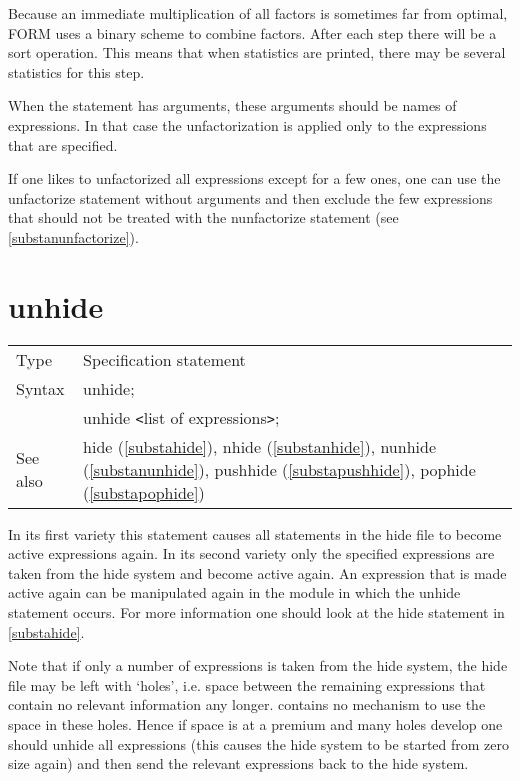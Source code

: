 \noindent Because an immediate multiplication of all factors is sometimes 
far from optimal, FORM uses a binary scheme to combine factors. After each 
step there will be a sort operation. This means that when statistics are 
printed, there may be several statistics for this step.

\noindent When the statement has arguments, these arguments should be names 
of expressions. In that case the unfactorization is applied only to the 
expressions that are specified.

\noindent If one likes to unfactorized all expressions except for a few 
ones, one can use the unfactorize statement without arguments and then 
exclude the few expressions that should not be treated with the 
nunfactorize statement (see \ref{substanunfactorize}).
\vspace{10mm} 


\section{unhide}
\label{substaunhide}

\noindent \begin{tabular}{ll}
Type & Specification statement\\
Syntax & unhide; \\
       & unhide {\tt<}list of expressions{\tt>};
\\ See also & hide (\ref{substahide}),
              nhide (\ref{substanhide}),
              nunhide (\ref{substanunhide}),
              pushhide (\ref{substapushhide}),
              pophide (\ref{substapophide})
\end{tabular} \vspace{4mm}

\noindent In its first variety this statement causes all 
statements in the hide file to become 
active expressions again. In its second variety only the 
specified expressions are taken from the hide system and become active 
again. An expression that is made active again can be manipulated again in 
the module in which the unhide statement occurs. For more information one 
should look at the hide statement in \ref{substahide}. \vspace{4mm}

\noindent Note that if only a number of expressions is taken from the hide 
system, the hide file may be left with `holes', i.e. space between the 
remaining expressions that contain no relevant information any longer. 
{\FORM} contains no mechanism to use the space in these holes. Hence if 
space is at a premium and many holes develop one should unhide all 
expressions (this causes the hide system to be started from zero size 
again) and then send the relevant expressions back to the hide system. 
\vspace{10mm}

